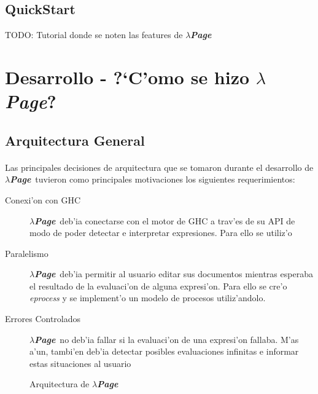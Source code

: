 \documentclass[a4paper]{article}
\newcommand{\hpage}{\textbf{\textsl{$\lambda$Page}}}
\begin{document}
\subsection{QuickStart}TODO: Tutorial donde se noten las features de \hpage
\newpage

\section{Desarrollo - ?`C'omo se hizo \hpage?}
\subsection{Arquitectura General}
\paragraph{}Las principales decisiones de arquitectura que se tomaron durante el desarrollo de \hpage\ tuvieron como principales motivaciones los siguientes requerimientos:
\begin{description}
\item[Conexi'on con GHC] \hpage\ deb'ia conectarse con el motor de GHC a trav'es de su API de modo de poder detectar e interpretar expresiones.  Para ello se utiliz'o 
\item[Paralelismo] \hpage\ deb'ia permitir al usuario editar sus documentos mientras esperaba el resultado de la evaluaci'on de alguna expresi'on.  Para ello se cre'o \textsl{eprocess} y se implement'o un modelo de procesos utiliz'andolo.
\item[Errores Controlados] \hpage\ no deb'ia fallar si la evaluaci'on de una expresi'on fallaba.  M'as a'un, tambi'en deb'ia detectar posibles evaluaciones infinitas e informar estas situaciones al usuario
\end{description}
\begin{figure}[htbp]
	\begin{center}
		\caption{Arquitectura de \hpage}
		\label{arq1}
	\end{center}
\end{figure}
\end{document}
